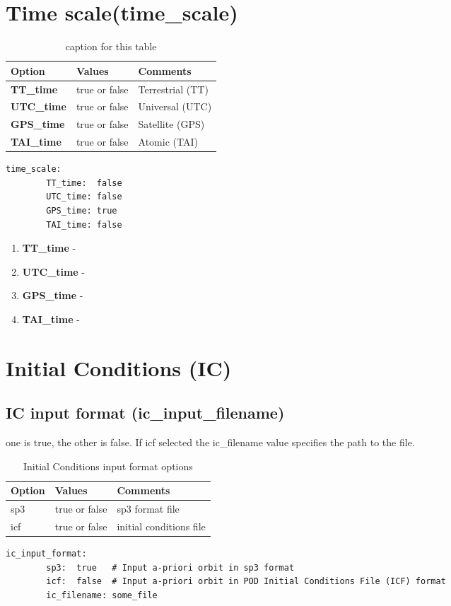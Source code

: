 \section{Time scale(time\_scale)}
%
\begin{table}[h!]
\begin{tabular}{|p{4.5cm}|p{2cm}|p{3.5cm}|}
\hline
Option & Values & Comments \\
\hline
\textbf{TT\_time} & true or false & Terrestrial (TT)\\
\textbf{UTC\_time} & true or false & Universal (UTC)\\
\textbf{GPS\_time} & true or false & Satellite (GPS)\\
\textbf{TAI\_time} & true or false & Atomic (TAI)\\
\hline
\end{tabular}
\caption{caption for this table}
\label{table:label_name}
\end{table}
%
\begin{lstlisting}[language=xml,caption=time\_scale yaml configuration example]
	time_scale:
		TT_time:  false
		UTC_time: false
		GPS_time: true
		TAI_time: false
\end{lstlisting}
%
\begin{enumerate}
	\item \textbf{TT\_time} - 
	\item \textbf{UTC\_time} - 
	\item \textbf{GPS\_time} - 
	\item \textbf{TAI\_time} -
\end{enumerate}
%
\section{Initial Conditions (IC)}
\subsection{IC input format (ic\_input\_filename)}
 one is true, the other is false. If icf selected the ic\_filename value specifies the path to the file.
\begin{table}[h!]
\begin{tabular}{|p{4.5cm}|p{2cm}|p{3.5cm}|}
	\hline
	Option & Values & Comments \\
	\hline
   sp3 & true or false & sp3 format file\\
   icf & true or false & initial conditions file\\
   \hline
\end{tabular}
\caption{Initial Conditions input format options}
\label{table:yaml}
\end{table}
%
\begin{lstlisting}[language=xml,caption=ic\_input\_format yaml configuration example]
 	ic_input_format:
		sp3:  true   # Input a-priori orbit in sp3 format
		icf:  false  # Input a-priori orbit in POD Initial Conditions File (ICF) format
		ic_filename: some_file
\end{lstlisting}
%
